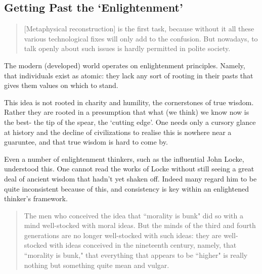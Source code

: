 \documentclass[letterpaper]{article}
\begin{document}
\subsection{Getting Past the `Enlightenment'}


\begin{quote}
  [Metaphysical reconstruction] is the first task, because without it all these various technological fixes will only add to the confusion. But nowadays, to talk openly about such issues is hardly permitted in polite society.
\end{quote}

The modern (developed) world operates on enlightenment principles. Namely, that individuals exist as atomic: they lack any sort of rooting in their pasts that gives them values on which to stand.

This idea is not rooted in charity and humility, the cornerstones of true wisdom. Rather they are rooted in a presumption that what (we think) we know now is the best- the tip of the spear, the `cutting edge'. One needs only a cursory glance at history and the decline of civilizations to realise this is nowhere near a guaruntee, and that true wisdom is hard to come by.

Even a number of enlightenment thinkers, such as the influential John Locke, understood this. One cannot read the works of Locke without still seeing a great deal of ancient wisdom that hadn't yet shaken off. Indeed many regard him to be quite inconsistent because of this, and consistency is key within an enlightened thinker's framework.

\begin{quote}
  The men who conceived the idea that ``morality is bunk" did so with a mind well-stocked with moral ideas. But the minds of the third and fourth generations are no longer well-stocked with such ideas: they are well-stocked with ideas conceived in the nineteenth century, namely, that ``morality is bunk," that everything that appears to be ``higher" is really nothing but something quite mean and vulgar.
\end{quote}
\end{document}
